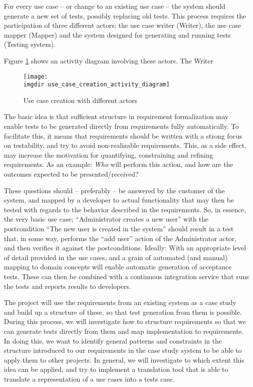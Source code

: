 \noindent For every use case -- or change to an existing use case -- the system should generate a new set of tests, possibly replacing old tests. This process requires the participation of three different actors; the use case writer (Writer), the use case mapper (Mapper) and the system designed for generating and running tests (Testing system).\medskip

Figure \ref{fig:use_case_creation_activity_diagram} shows an activity diagram involving these actors. The Writer 
\begin{figure}[!htbp]
\texttt{[image: \\imgdir use\_case\_creation\_activity\_diagram]}
\centering
\caption{Use case creation with different actors}
\label{fig:use_case_creation_activity_diagram}
\end{figure}
\noindent The basic idea is that sufficient structure in requirement formalization may enable tests to be generated directly from requirements fully automatically. To facilitate this, it means that requirements should be written with a strong focus on testability, and try to avoid non-realizable requirements. This, as a side effect, may increase the motivation for quantifying, constraining and refining requirements. As an example: \emph{Who} will perform this action, and how are the outcomes expected to be presented/received?\medskip

\noindent These questions should -- preferably -- be answered by the customer of the system, and mapped by a developer to actual functionality that may then be tested with regards to the behavior described in the requirements. So, in essence, the very basic use case; ``Administrator creates a new user'' with the postcondition ``The new user is created in the system'' should result in a test that, in some way, performs the ``add user'' action of the Administrator actor, and then verifies it against the postconditions. Ideally: With an appropriate level of detail provided in the use cases, and a grain of automated (and manual) mapping to domain concepts will enable automatic generation of acceptance tests. These can then be combined with a continuous integration service that runs the tests and reports results to developers.\medskip

\noindent The project will use the requirements from an existing system as a case study and build up a structure of these, so that test generation from them is possible. During this process, we will investigate how to structure requirements so that we can generate tests directly from them and map implementation to requirements. In doing this, we want to identify general patterns and constraints in the structure introduced to our requirements in the case study system to be able to apply them to other projects. In general, we will investigate to which extent this idea can be applied, and try to implement a translation tool that is able to translate a representation of a use cases into a tests case.\medskip


